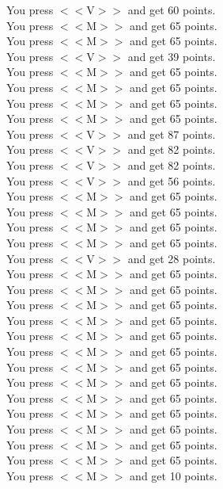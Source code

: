 \documentclass[pdflatex,sn-nature]{sn-jnl}%
\theoremstyle{thmstyleone}%
\theoremstyle{thmstyletwo}%
\theoremstyle{thmstylethree}%
\begin{document}
You press $<<$V$>>$ and get 60 points. $~$\\ 
You press $<<$M$>>$ and get 65 points. $~$\\ 
You press $<<$M$>>$ and get 65 points. $~$\\ 
You press $<<$V$>>$ and get 39 points. $~$\\ 
You press $<<$M$>>$ and get 65 points. $~$\\ 
You press $<<$M$>>$ and get 65 points. $~$\\ 
You press $<<$M$>>$ and get 65 points. $~$\\ 
You press $<<$M$>>$ and get 65 points. $~$\\ 
You press $<<$V$>>$ and get 87 points. $~$\\ 
You press $<<$V$>>$ and get 82 points. $~$\\ 
You press $<<$V$>>$ and get 82 points. $~$\\ 
You press $<<$V$>>$ and get 56 points. $~$\\ 
You press $<<$M$>>$ and get 65 points. $~$\\ 
You press $<<$M$>>$ and get 65 points. $~$\\ 
You press $<<$M$>>$ and get 65 points. $~$\\ 
You press $<<$M$>>$ and get 65 points. $~$\\ 
You press $<<$V$>>$ and get 28 points. $~$\\ 
You press $<<$M$>>$ and get 65 points. $~$\\ 
You press $<<$M$>>$ and get 65 points. $~$\\ 
You press $<<$M$>>$ and get 65 points. $~$\\ 
You press $<<$M$>>$ and get 65 points. $~$\\ 
You press $<<$M$>>$ and get 65 points. $~$\\ 
You press $<<$M$>>$ and get 65 points. $~$\\ 
You press $<<$M$>>$ and get 65 points. $~$\\ 
You press $<<$M$>>$ and get 65 points. $~$\\ 
You press $<<$M$>>$ and get 65 points. $~$\\ 
You press $<<$M$>>$ and get 65 points. $~$\\ 
You press $<<$M$>>$ and get 65 points. $~$\\ 
You press $<<$M$>>$ and get 65 points. $~$\\ 
You press $<<$M$>>$ and get 65 points. $~$\\ 
You press $<<$M$>>$ and get 10 points. $~$\\ 
\end{document}
